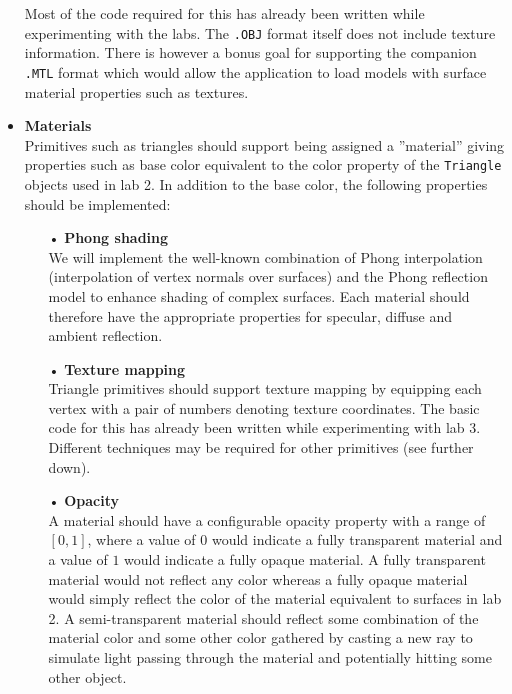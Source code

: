 \documentclass[a4paper,11pt]{article}
\begin{document}
\begin{itemize}
Most of the code required for this has already been written while experimenting with the labs.
The \texttt{.OBJ} format itself does not include texture information. There is however a bonus goal
for supporting the companion \texttt{.MTL} format which would allow the application to load models
with surface material properties such as textures.

\item \textbf{Materials}\\
Primitives such as triangles should support being assigned a ''material'' giving properties such
as base color equivalent to the color property of the \texttt{Triangle} objects used in lab 2. In addition
to the base color, the following properties should be implemented:
\begin{itemize}
\item[•] \textbf{Phong shading} \\
We will implement the well-known combination of Phong interpolation (interpolation of vertex normals over surfaces)
and the Phong reflection model to enhance shading of complex surfaces. Each material should therefore
have the appropriate properties for specular, diffuse and ambient reflection.

\item[•] \textbf{Texture mapping}\\
Triangle primitives should support texture mapping by equipping each vertex with a pair of numbers
denoting texture coordinates. The basic code for this has already been written while experimenting
with lab 3. Different techniques may be required for other primitives
(see further down).

\item[•] \textbf{Opacity}\\
A material should have a configurable opacity property with a range of $[0,1]$, where a value of
$0$ would indicate a fully transparent material and a value of $1$ would indicate a fully opaque
material. A fully transparent material would not reflect any color whereas a fully opaque material
would simply reflect the color of the material equivalent to surfaces in lab 2. A semi-transparent
material should reflect some combination of the material color and some other color gathered by
casting a new ray to simulate light passing through the material and potentially hitting some other
object.


\end{itemize}
\end{itemize}
\end{document}
